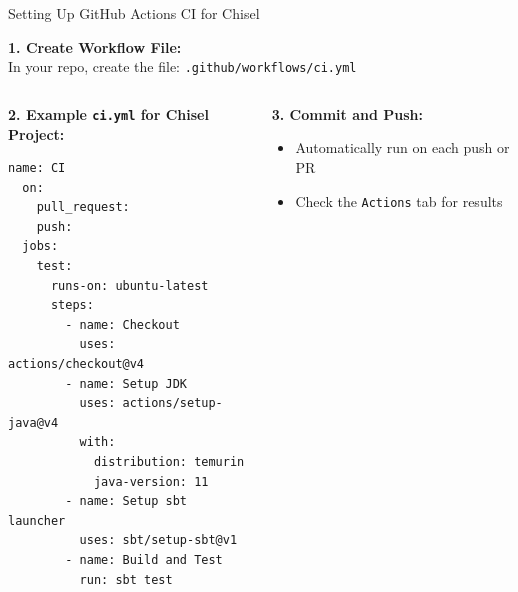 \begin{frame}[fragile]{Setting Up GitHub Actions CI for Chisel}
	\scriptsize
	
	\textbf{1. Create Workflow File:} \\
	In your repo, create the file: \texttt{.github/workflows/ci.yml}
	
	\pause
	\begin{columns}
		\begin{column}{0.5\textwidth}
			\textbf{2. Example \texttt{ci.yml} for Chisel Project:}
			\begin{verbatim}
name: CI
  on:
    pull_request:
    push:
  jobs:
    test:
      runs-on: ubuntu-latest
      steps:
        - name: Checkout
          uses: actions/checkout@v4
        - name: Setup JDK
          uses: actions/setup-java@v4
          with:
            distribution: temurin
            java-version: 11
        - name: Setup sbt launcher
          uses: sbt/setup-sbt@v1
        - name: Build and Test
          run: sbt test
			\end{verbatim}
		\end{column}
		\begin{column}{0.4\textwidth}
	
			\pause
			\textbf{3. Commit and Push:}
			\begin{itemize}
				\item Automatically run on each push or PR
				\item Check the \texttt{Actions} tab for results
			\end{itemize}
		\end{column}
	\end{columns}
	
\end{frame}

